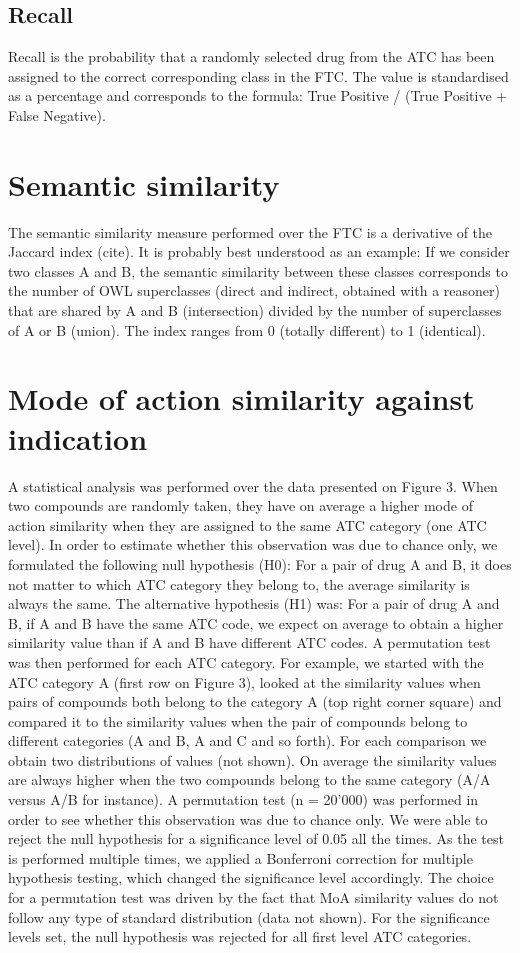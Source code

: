 \documentclass{bioinfo}
\begin{document}
\subsection{Recall}
Recall is the probability that a randomly selected drug from the ATC has been assigned to the correct 
corresponding class in the FTC. The value is standardised as a percentage and corresponds 
to the formula: True Positive / (True Positive + False Negative).

\section{Semantic similarity}
The semantic similarity measure performed over the FTC is a derivative of the Jaccard index (cite). 
It is probably best understood as an example: If we consider two classes A and B, the semantic similarity 
between these classes corresponds to the number of OWL superclasses (direct and indirect, obtained with a reasoner) that 
are shared by A and B (intersection) divided by the number of superclasses of A or B (union). The index ranges 
from 0 (totally different) to 1 (identical).

\section{Mode of action similarity against indication}
A statistical analysis was performed over the data presented on Figure 3. 
When two compounds are randomly taken, they have on average a higher mode of action similarity when 
they are assigned to the same ATC category (one ATC level). In order to estimate whether this observation was 
due to chance only, we formulated the following null hypothesis (H0): For a pair of drug A and B, it does not 
matter to which ATC category they belong to, the average similarity is always the same. 
The alternative hypothesis (H1) was: For a pair of drug A and B, if A and B have the same ATC code, 
we expect on average to obtain a higher similarity value than if A and B have different ATC codes. 
A permutation test was then performed for each ATC category. For example, we started with the ATC 
category A (first row on Figure 3), looked at the similarity values when pairs of compounds both belong 
to the category A (top right corner square) and compared it to the similarity values when the pair of compounds 
belong to different categories (A and B, A and C and so forth). For each comparison we obtain two distributions of 
values (not shown). On average the similarity values are always higher when the two compounds 
belong to the same category (A/A versus A/B for instance). A permutation test (n = 20'000) was 
performed in order to see whether this observation was due to chance only. We were able to reject the null 
hypothesis for a significance level of 0.05 all the times. As the test is performed multiple times, 
we applied a Bonferroni correction for multiple hypothesis testing, which changed the significance level accordingly. 
The choice for a permutation test was driven by the fact that MoA similarity values do not follow any type 
of standard distribution (data not shown). For the significance levels set, the null hypothesis was rejected for 
all first level ATC categories.
\end{document}
